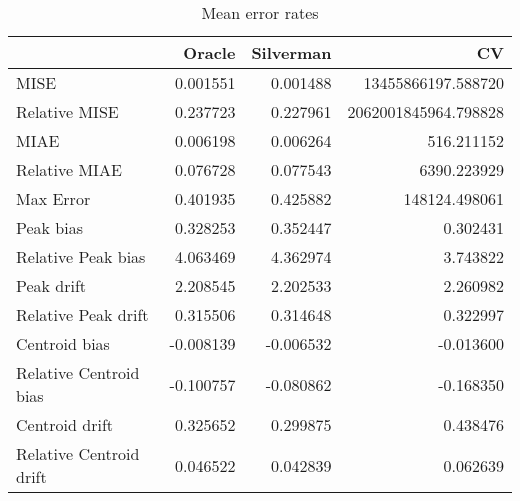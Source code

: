 \begin{table}[H]
\centering
\begin{tabular}{lrrr}
  \hline
 & Oracle & Silverman & CV \\ 
  \hline
MISE & 0.001551 & 0.001488 & 13455866197.588720 \\ 
  Relative MISE & 0.237723 & 0.227961 & 2062001845964.798828 \\ 
  MIAE & 0.006198 & 0.006264 & 516.211152 \\ 
  Relative MIAE & 0.076728 & 0.077543 & 6390.223929 \\ 
  Max Error & 0.401935 & 0.425882 & 148124.498061 \\ 
  Peak bias & 0.328253 & 0.352447 & 0.302431 \\ 
  Relative Peak bias & 4.063469 & 4.362974 & 3.743822 \\ 
  Peak drift & 2.208545 & 2.202533 & 2.260982 \\ 
  Relative Peak drift & 0.315506 & 0.314648 & 0.322997 \\ 
  Centroid bias & -0.008139 & -0.006532 & -0.013600 \\ 
  Relative Centroid bias & -0.100757 & -0.080862 & -0.168350 \\ 
  Centroid drift & 0.325652 & 0.299875 & 0.438476 \\ 
  Relative Centroid drift & 0.046522 & 0.042839 & 0.062639 \\ 
   \hline
\end{tabular}
\caption{Mean error rates} 
\label{tbl:mean_error_rates}
\end{table}
